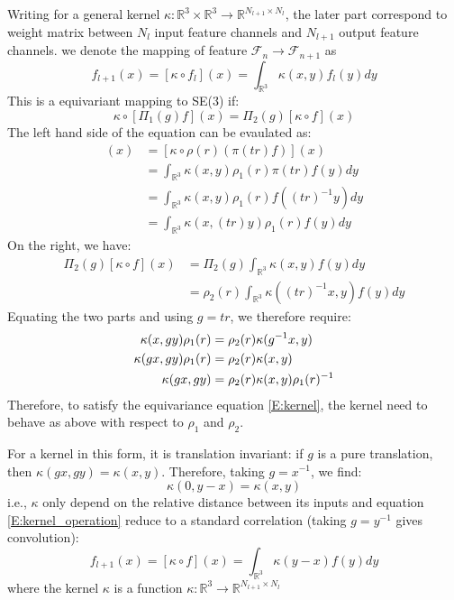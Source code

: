 \documentclass{article}
\newcommand{\bbr}{\mathbb{R}}
\newcommand{\calf}{\mathcal{F}}
\begin{document}
Writing for a general kernel $\kappa\colon \bbr^3 \times \bbr^3 \to \bbr^{N_{l+1}\times N_{l}}$, the later part correspond to weight matrix 
between $N_l$ input feature channels and $N_{l+1}$ output feature channels. 
we denote the mapping of feature $\calf_n \to \calf_{n+1}$ as 
\begin{equation}
    f_{l+1}(x) = [\kappa \circ f_l](x) = \int_{\bbr^3} \kappa(x,y) f_l(y) dy \label{E:kernel_operation}
\end{equation}
This is a equivariant mapping to SE(3) if:
\begin{equation}
    \kappa \circ [\Pi_1 (g)f](x) = \Pi_2 (g) [\kappa \circ f](x) \label{E:kernel}
\end{equation} 
The left hand side of the equation can be evaulated as:
\begin{align*}
    [ \kappa \circ \Pi_1 (tr)f ] (x) &= [\kappa \circ \rho(r) (\pi(tr) f) ](x) \\
    &= \int_{\bbr^3} \kappa(x,y) \rho_1(r) \pi(tr) f(y) dy \\
    &= \int_{\bbr^3} \kappa(x,y) \rho_1(r) f((tr)^{-1}y) dy \\
    &= \int_{\bbr^3} \kappa(x,(tr)y) \rho_1(r) f(y) dy 
\end{align*}
On the right, we have:
\begin{align*}
    \Pi_2 (g) [\kappa \circ f](x) &= \Pi_2 (g) \int_{\bbr^3} \kappa(x,y) f(y) dy \\
    &= \rho_2(r) \int_{\bbr^3} \kappa((tr)^{-1}x,y) f(y) dy
\end{align*}
Equating the two parts and using $g= tr$, we therefore require:
\begin{align}
    \kappa(x,gy) \rho_1(r) &= \rho_2(r) \kappa(g^{-1}x,y) \notag \\
    \kappa(gx,gy) \rho_1(r) &= \rho_2(r) \kappa(x,y) \notag \\
    \kappa(gx,gy) &= \rho_2(r) \kappa(x,y) \rho_1(r) ^{-1} \label{E:kernel_require}
\end{align}
Therefore, to satisfy the equivariance equation \eqref{E:kernel}, the kernel need to behave as above 
with respect to $\rho_1$ and $\rho_2$. 

For a kernel in this form, it is translation invariant: if $g$ is a pure translation, 
then $\kappa(gx,gy) =  \kappa(x,y)$. Therefore, taking $g = x^{-1}$, we find:
\begin{equation}
    \kappa(0,y-x) = \kappa(x,y)
\end{equation}
i.e., $\kappa$ only depend on the relative distance between its inputs and equation \eqref{E:kernel_operation}
reduce to a standard correlation (taking $g=y^{-1}$ gives convolution):
\begin{equation}
    f_{l+1}(x) = [\kappa \circ f](x) = \int_{\bbr^3} \kappa(y-x) f(y) dy
\end{equation}
where the kernel $\kappa$ is a function $\kappa \colon \bbr^3 \to \bbr^{N_{l+1}\times N_{l}}$
\end{document}
